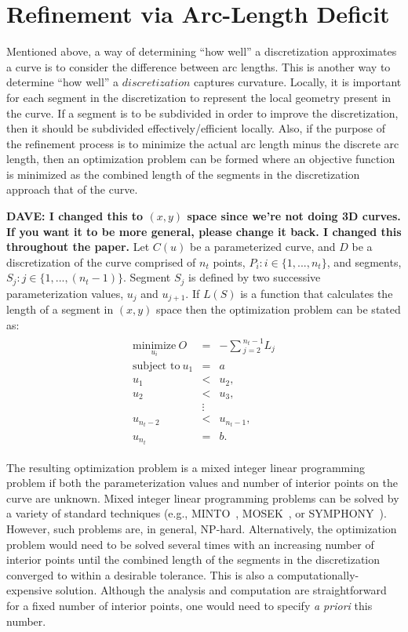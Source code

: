 \section{Refinement via Arc-Length Deficit}
Mentioned above, a way of determining ``how well'' a discretization 
approximates a curve is to consider the difference between arc lengths. 
This is another way to determine ``how well'' a $discretization$ captures curvature. Locally, it is important for each segment in the discretization to represent the local geometry present in the curve. If a segment is to be subdivided in order to improve the discretization, then it should be subdivided 
effectively/efficient locally.
Also, if the purpose of the refinement process is to minimize the actual arc length minus the discrete arc length, then an optimization problem can be formed where an objective function is minimized as the combined length of the segments in the discretization approach that of the curve.

{\bf{DAVE:  I changed this to $(x,y)$ space since we're not doing 3D 
curves.  If you want it to be more general, please change it back.  I 
changed this throughout the paper.}}
Let $C(u)$ be a parameterized curve, and $D$ be a discretization of the 
curve comprised of $n_t$ points, $P_i : i \in \{1,...,n_t\}$, and 
segments, $S_j : j \in \{1,...,(n_t-1)\}$. Segment $S_j$ is defined by two successive parameterization values, $u_j$ and $u_{j+1}$. If $L(S)$ is a function that calculates the length of a segment in $(x,y)$ space then the optimization problem can be stated as:
\begin{eqnarray*}
\begin{array}{rcl}
\underset{u_i}{\text{minimize}} \ O & = & -\sum{_{j=2}^{n_t-1}L_j} \\
\text{subject to} \ u_1 & = & a \\
u_1 & < & u_2, \\ 
u_2 & < & u_3, \\
& \vdots & \\
u_{n_t-2} & < & u_{n_t-1},\\ 
u_{n_t} & = & b.
\end{array}
\end{eqnarray*}

The resulting optimization problem is a mixed integer linear programming 
problem if both the parameterization values and number of interior points 
on the curve are unknown.  Mixed integer linear programming problems can 
be solved by a variety of standard techniques (e.g., MINTO~\cite{minto}, 
MOSEK~\cite{mosek}, or SYMPHONY~\cite{symphony}).  However, such problems 
are, in general, NP-hard.  Alternatively, the optimization problem would 
need to be solved several times with an increasing number of interior 
points until the combined length of the segments in the discretization 
converged to within a desirable tolerance.  This is also a 
computationally-expensive solution.  Although the analysis and computation 
are straightforward for a fixed number of interior points, one would need 
to specify {\it{a priori}} this number.

